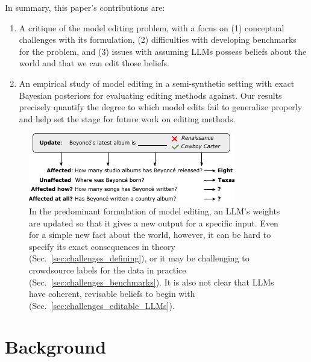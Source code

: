 \documentclass[11pt,a4paper]{article}
\begin{document}
In summary, this paper's contributions are:

\vspace{-3pt}
\begin{enumerate}[leftmargin=12pt, itemsep=-2pt]
\item A critique of the model editing problem,  with a focus on (1) conceptual challenges with its formulation, (2)  difficulties with developing benchmarks for the problem, and (3) issues with assuming LLMs possess beliefs about the world and that we can edit those beliefs. 
\item An empirical study of model editing in a semi-synthetic setting with exact Bayesian posteriors for evaluating editing methods against. Our results precisely quantify the degree to which model edits fail to generalize properly and help set the stage for future work on editing methods.
\end{enumerate}

\begin{figure}[!t]
   \centering
   \includegraphics[width=.49\textwidth]{figs/fig1.pdf}
   \vspace{-13pt}
   \caption{
   In the predominant formulation of model editing, an LLM's weights are updated so that it gives a new output for a specific input. 
   Even for a simple new fact about the world, however, it can be hard to specify its exact consequences in theory (Sec.~\ref{sec:challenges_defining}), or it may be challenging to crowdsource labels for the data in practice (Sec.~\ref{sec:challenges_benchmarks}). It is also not clear that LLMs have coherent, revisable beliefs to begin with (Sec.~\ref{sec:challenges_editable_LLMs}).
   }
   \vspace{-2pt}
   \label{fig:example}
\end{figure}

\section{Background}
\end{document}
